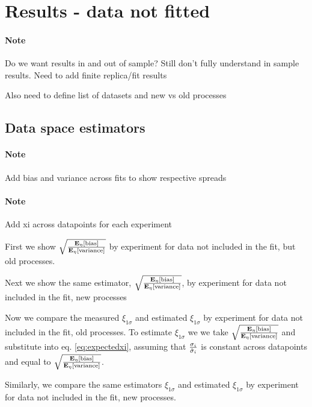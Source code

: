\section{Results - data not fitted}
\paragraph{Note}{Do we want results in and out of sample? Still don't
fully understand in sample results. Need to add finite replica/fit results}

Also need to define list of datasets and new vs old processes

\subsection{Data space estimators}

\paragraph{Note}{Add bias and variance across fits to show respective spreads}

\paragraph{Note}{Add xi across datapoints for each experiment}

First we show $\sqrt{\frac{\mathbf{E}_{\eta}\left[ {\rm bias} \right]}{\mathbf{E}_{\eta}\left[ {\rm variance} \right]}}$ by experiment for data
not included in the fit, but old processes.



Next we show the same estimator, $\sqrt{\frac{\mathbf{E}_{\eta}\left[ {\rm bias} \right]}{\mathbf{E}_{\eta}\left[ {\rm variance} \right]}}$, by
experiment for data not included in the fit, new processes



Now we compare the measured $\xi_{1\sigma}$ and estimated $\xi_{1\sigma}$ by experiment
for data not included in the fit, old processes. To estimate $\xi_{1\sigma}$
we we take $\sqrt{\frac{\mathbf{E}_{\eta}\left[ {\rm bias} \right]}{\mathbf{E}_{\eta}\left[ {\rm variance} \right]}}$ and substitute into
eq. \eqref{eq:expectedxi}, assuming that $\frac{\sigma_i}{\hat{\sigma}_i}$ is
constant across datapoints and equal to $\sqrt{\frac{\mathbf{E}_{\eta}\left[ {\rm bias} \right]}{\mathbf{E}_{\eta}\left[ {\rm variance} \right]}}$.



Similarly, we compare the same estimators $\xi_{1\sigma}$ and estimated
$\xi_{1\sigma}$ by experiment for data not included in the fit, new processes.

